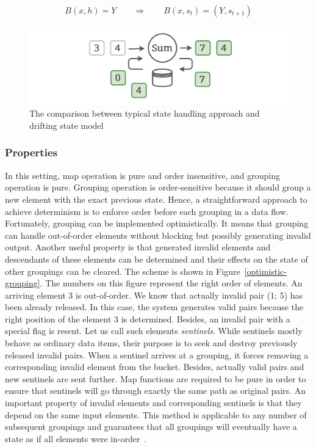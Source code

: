 \begin{equation}
  \label{flink-contract}
  B(x, h) = Y \qquad\Longrightarrow\qquad B(x, s_{t}) = (Y, s_{t+1}) 
\end{equation}

\begin{figure}[htbp]
  \centering
  \includegraphics[width=.49\textwidth]{pics/classical-drifting}
  \caption{The comparison between typical state handling approach and drifting state model}
  \label {classical-drifting}
\end{figure}

\subsubsection{Properties}

In this setting, map operation is pure and order insensitive, and grouping operation is pure. Grouping operation is order-sensitive because it should group a new element with the exact previous state. Hence, a straightforward approach to achieve determinism is to enforce order before each grouping in a data flow. Fortunately, grouping can be implemented optimistically. It means that grouping can handle out-of-order elements without blocking but possibly generating invalid output. Another useful property is that generated invalid elements and descendants of these elements can be determined and their effects on the state of other groupings can be cleared. The scheme is shown in Figure~\ref{optimistic-grouping}. The numbers on this figure represent the right order of elements. An arriving element 3 is out-of-order. We know that actually invalid pair (1; 5) has been already released. In this case, the system generates valid pairs because the right position of the element 3 is determined. Besides, an invalid pair with a special flag is resent. Let us call such elements {\em sentinels}. While sentinels mostly behave as ordinary data items, their purpose is to seek and destroy previously released invalid pairs. When a sentinel arrives at a grouping, it forces removing a corresponding invalid element from the bucket. Besides, actually valid pairs and new sentinels are sent further. Map functions are required to be pure in order to ensure that sentinels will go through exactly the same path as original pairs. An important property of invalid elements and corresponding sentinels is that they depend on the same input elements. This method is applicable to any number of subsequent groupings and guarantees that all groupings will eventually have a state as if all elements were in-order~\cite{we2018adbis}.
 
